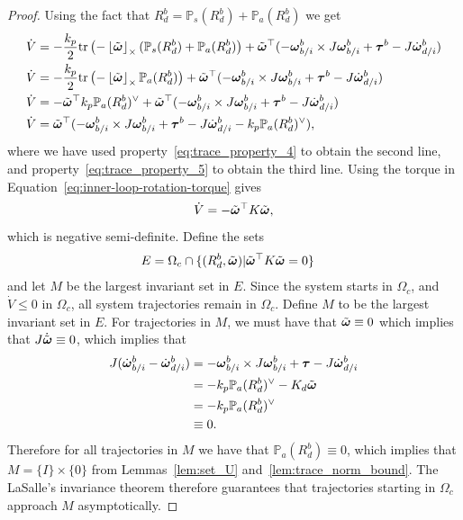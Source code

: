 \begin{proof}
Using the fact that $R_d^b=\mathbb{P}_s(R_d^b)+\mathbb{P}_a(R_d^b)$ we get
\begin{align*}
\dot{V} &= -\frac{k_p}{2} \text{tr}\left(-\left\lfloor\tilde{\boldsymbol{\omega}}\right\rfloor_{\times} (\mathbb{P}_s(R_d^b)+\mathbb{P}_a(R_d^b) \right) + \tilde{\boldsymbol{\omega}}^\top ( -\boldsymbol{\omega}_{b/i}^b \times J\boldsymbol{\omega}_{b/i}^b + \boldsymbol{\tau}^b - J\dot{\boldsymbol{\omega}}_{d/i}^b) \\
\dot{V} &= -\frac{k_p}{2} \text{tr}\left(-\left\lfloor\tilde{\boldsymbol{\omega}}\right\rfloor_{\times} \mathbb{P}_a(R_d^b) \right) + \tilde{\boldsymbol{\omega}}^\top ( -\boldsymbol{\omega}_{b/i}^b \times J\boldsymbol{\omega}_{b/i}^b + \boldsymbol{\tau}^b - J\dot{\boldsymbol{\omega}}_{d/i}^b) \\
\dot{V} &= -\tilde{\boldsymbol{\omega}}^\top k_p\mathbb{P}_a(R_d^b)^\vee + \tilde{\boldsymbol{\omega}}^\top ( -\boldsymbol{\omega}_{b/i}^b \times J\boldsymbol{\omega}_{b/i}^b + \boldsymbol{\tau}^b - J\dot{\boldsymbol{\omega}}_{d/i}^b) \\
\dot{V} &= \tilde{\boldsymbol{\omega}}^\top ( -\boldsymbol{\omega}_{b/i}^b \times J \boldsymbol{\omega}_{b/i}^b + \boldsymbol{\tau}^b - J\dot{\boldsymbol{\omega}}_{d/i}^b - k_p\mathbb{P}_a(R_d^b)^\vee ),
\end{align*}
where we have used property~\eqref{eq:trace_property_4} to obtain the second line, and property~\eqref{eq:trace_property_5} to obtain the third line.
Using the torque in Equation~\eqref{eq:inner-loop-rotation-torque} gives
\[
\dot{V} = -\tilde{\boldsymbol{\omega}}^\top K \tilde{\boldsymbol{\omega}},
\]
which is negative semi-definite.  Define the sets
\begin{align*}	
E &= \Omega_c \cap \{(R_d^b,\tilde{\boldsymbol{\omega}})| \tilde{\boldsymbol{\omega}}^\top K \tilde{\boldsymbol{\omega}}=0\}
\end{align*}
and let $M$ be the largest invariant set in $E$.  Since the system starts in $\Omega_c$, and $\dot{V}\leq 0$ in $\Omega_c$, all system trajectories remain in $\Omega_c$.  
Define $M$ to be the largest invariant set in $E$.  For trajectories in $M$, we must have that $\tilde{\boldsymbol{\omega}}\equiv 0$ which implies that $J\dot{\tilde{\boldsymbol{\omega}}}\equiv 0$,
which implies that
\begin{align*}
J(\dot{\boldsymbol{\omega}}_{b/i}^b-\dot{\boldsymbol{\omega}}_{d/i}^b) &= -\boldsymbol{\omega}_{b/i}^b \times J\boldsymbol{\omega}_{b/i}^b + \boldsymbol{\tau} - J\dot{\boldsymbol{\omega}}_{d/i}^b \\
	&= -k_p\mathbb{P}_a(R_d^b)^\vee - K_d\tilde{\boldsymbol{\omega}} \\
	&= -k_p\mathbb{P}_a(R_d^b)^\vee \\
	&\equiv 0.
\end{align*}
Therefore for all trajectories in $M$ we have that $\mathbb{P}_a(R_d^b)\equiv 0$, which implies that $M = \{I\} \times \{0\}$ from Lemmas~\ref{lem:set_U} and~\ref{lem:trace_norm_bound}.
The LaSalle's invariance theorem therefore guarantees that trajectories starting in $\Omega_c$ approach $M$ asymptotically. 
\end{proof}

